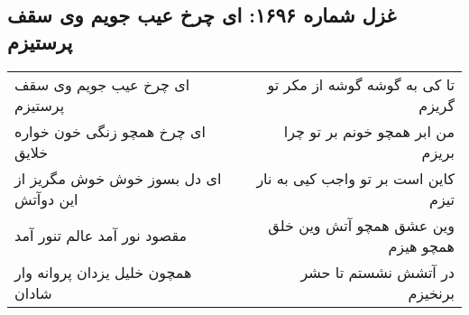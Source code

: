 \begin{center}
\section*{غزل شماره ۱۶۹۶: ای چرخ عیب جویم وی سقف پرستیزم}
\label{sec:1696}
\begin{longtable}{l p{0.5cm} r}
ای چرخ عیب جویم وی سقف پرستیزم
&&
تا کی به گوشه گوشه از مکر تو گریزم
\\
ای چرخ همچو زنگی خون خواره خلایق
&&
من ابر همچو خونم بر تو چرا بریزم
\\
ای دل بسوز خوش خوش مگریز از این دوآتش
&&
کاین است بر تو واجب کیی به نار تیزم
\\
مقصود نور آمد عالم تنور آمد
&&
وین عشق همچو آتش وین خلق همچو هیزم
\\
همچون خلیل یزدان پروانه وار شادان
&&
در آتشش نشستم تا حشر برنخیزم
\\
\end{longtable}
\end{center}
